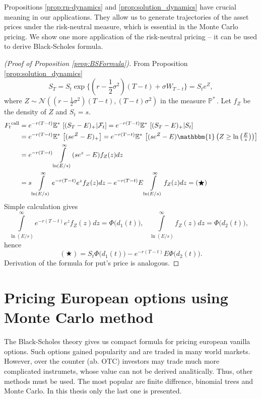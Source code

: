 \documentclass[a4paper,12pt, oneside]{book}
\theoremstyle{definition}
\theoremstyle{remark}
\def\Em{{\mathbb{E}^*}\,}
\def\Pm{{\mathbb{P}}^*\,}
\begin{document}
Propositions \ref{prop:rn-dynamics} and \ref{prop:solution_dynamics} have crucial meaning in our applications. They allow us to generate trajectories of the asset prices under the risk-neutral measure, which is essential in the Monte Carlo pricing. We show one more application of the risk-neutral pricing -- it can be used to derive Black-Scholes formula.
\begin{proof}[(Proof of Proposition \ref{prop:BSFormula})]
 From Proposition \ref{prop:solution_dynamics}
 \[ S_T = S_t \exp\bigl\{ (r - \frac{1}{2} \sigma^2)(T-t) + \sigma W_{T-t} \bigr\} = S_t e^Z, \]
 where $Z \sim \mathcal{N}\left((r - \frac{1}{2} \sigma^2)(T-t), (T-t)\sigma^2 \right)$ in the measure $\Pm$. Let $f_Z$ be the density of $Z$ and $S_t = s$.
 \begin{equation*}
  \begin{split}
    F_t\textsuperscript{call} &= e^{-r(T-t)} \Em\left[(S_T-E)_+ | \mathcal{F}_t \right] = e^{-r(T-t)} \Em\left[(S_T-E)_+ |S_t\right] \\
    &= e^{-r(T-t)} \Em\left[(s e^Z-E)_+ \right] = e^{-r(T-t)} \Em\left[(s e^Z-E) \mathbbm{1}\left({\textstyle Z \geq \ln\left(\frac{E}{s}\right)} \right) \right] \\
    &= e^{-r(T-t)} \int\limits_{\ln(E/s)}^\infty (se^z - E)f_Z(z) dz \\
    &= s\int\limits_{\ln(E/s)}^\infty e^{-r(T-t)}e^z f_Z(z) dz - e^{-r(T-t)} E\int\limits_{\ln(E/s)}^\infty f_Z(z) dz = (\bigstar)
  \end{split}
 \end{equation*}
 Simple calculation gives
 \[ \int\limits_{\ln(E/s)}^\infty e^{-r(T-t)}e^z f_Z(z) dz = \Phi\bigl( d_1(t) \bigr),  \ \ \ 
    \int\limits_{\ln(E/s)}^\infty f_Z(z) dz = \Phi\bigl( d_2(t) \bigr),  \ \ \ \]
 hence 
 \[ (\bigstar) = S_t \Phi\bigl( d_1(t) \bigr)  - e^{-r(T-t)} E \Phi\bigl( d_2(t) \bigr) . \]
 Derivation of the formula for put's price is analogous.
\end{proof}




\chapter[{Pricing European options using Monte Carlo method}]{Pricing European options using \\Monte Carlo method}
The Black-Scholes theory gives us compact formula for pricing european vanilla options. Such options gained popularity and are traded in many world markets. However, over the counter (ab. OTC) investors may trade much more complicated instrumets, whose value can not be derived analitically. Thus, other methods must be used.
The most popular are finite diffrence, binomial trees and Monte Carlo. In this thesis only the last one is presented.
\end{document}
